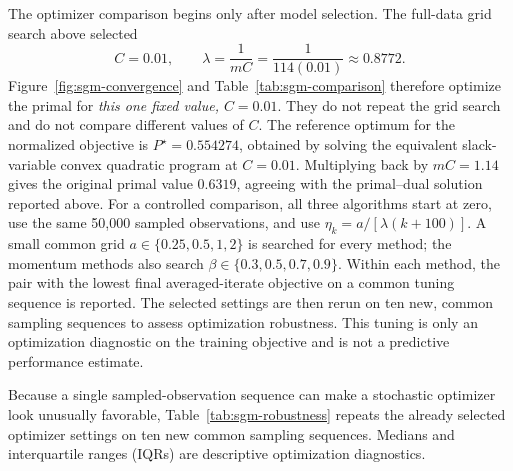 \documentclass[11pt,a4paper]{article}
\numberwithin{equation}{section} %
\begin{document}
The optimizer comparison begins only after model selection. The full-data grid
search above selected
\begin{equation}
    \boxed{C=0.01},\qquad
    \lambda=\frac{1}{mC}=\frac{1}{114(0.01)}\approx0.8772.
\end{equation}
Figure~\ref{fig:sgm-convergence} and Table~\ref{tab:sgm-comparison} therefore
optimize the primal for \emph{this one fixed value, $C=0.01$}. They do not
repeat the grid search and do not compare different values of $C$. The
reference optimum for the normalized objective is $P^\star=0.554274$, obtained
by solving the equivalent slack-variable convex quadratic program at
$C=0.01$. Multiplying back by $mC=1.14$ gives the original primal value
$0.6319$, agreeing with the primal--dual solution reported above. For a
controlled comparison, all three algorithms start at zero,
use the same 50,000 sampled observations, and use
$\eta_k=a/[\lambda(k+100)]$. A small common grid
$a\in\{0.25,0.5,1,2\}$ is searched for every method; the momentum methods also
search $\beta\in\{0.3,0.5,0.7,0.9\}$. Within each method, the pair with the
lowest final averaged-iterate objective on a common tuning sequence is
reported. The selected settings are then rerun on ten new, common sampling
sequences to assess optimization robustness. This tuning is only an
optimization diagnostic on the training objective and is not a predictive
performance estimate.

\begin{table}[htbp]
\centering
\caption{Controlled optimizer comparison for the single grid-selected value
$C=0.01$ ($\lambda\approx0.8772$). The
5\% and 1\% columns give the first step at which the best raw iterate reaches
the stated gap relative to $P^\star$; 114 steps correspond to approximately
one epoch. AUROC is in-sample and is shown only as a solution-agreement
diagnostic. Cosine is the similarity of the averaged iterate to the reference
QP solution.}
\label{tab:sgm-comparison}
\scriptsize
\resizebox{\textwidth}{!}{}
\end{table}

Because a single sampled-observation sequence can make a stochastic optimizer
look unusually favorable, Table~\ref{tab:sgm-robustness} repeats the already
selected optimizer settings on ten new common sampling sequences. Medians and
interquartile ranges (IQRs) are descriptive optimization diagnostics.

\begin{table}[htbp]
\centering
\caption{Robustness over ten new common sampling sequences at the single fixed
value $C=0.01$. Hyperparameters were selected on the separate seed-2026
sequence.}
\label{tab:sgm-robustness}
\scriptsize
\resizebox{\textwidth}{!}{}
\end{table}
\end{document}

